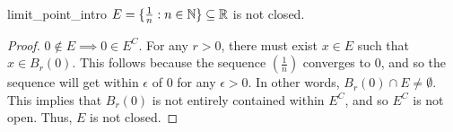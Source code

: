 \begin{exmp}{}{limit_point_intro}
\(E = \{ \frac{1}{n} : n \in {\mathbb N} \} \subseteq {\mathbb R}\) is not closed. \begin{proof}
\(0 \not \in E \implies 0 \in E^C\). For any \(r > 0\), there must exist \(x \in E\) such that \(x \in B_r(0)\). This follows because the sequence \((\frac{1}{n})\) converges to 0, and so the sequence will get within \(\epsilon\) of 0 for any \(\epsilon > 0\). In other words, \(B_r(0) \cap E \not = \emptyset\). This implies that \(B_r(0)\) is not entirely contained within \(E^C\), and so \(E^C\) is not open. Thus, \(E\) is not closed.
\end{proof}

\end{exmp}





